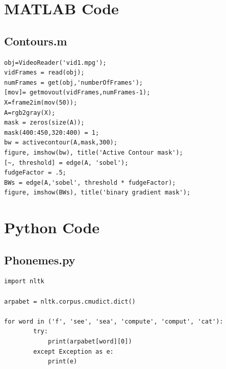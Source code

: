 \documentclass[a4paper]{article}
\begin{document}
\newpage

\appendix




\section{MATLAB Code}

\subsection{Contours.m}
\begin{lstlisting}[style=myMatlabstyle]
obj=VideoReader('vid1.mpg');
vidFrames = read(obj);
numFrames = get(obj,'numberOfFrames');
[mov]= getmovout(vidFrames,numFrames-1);
X=frame2im(mov(50));
A=rgb2gray(X);
mask = zeros(size(A));
mask(400:450,320:400) = 1;
bw = activecontour(A,mask,300);
figure, imshow(bw), title('Active Contour mask');
[~, threshold] = edge(A, 'sobel');
fudgeFactor = .5;
BWs = edge(A,'sobel', threshold * fudgeFactor);
figure, imshow(BWs), title('binary gradient mask');
\end{lstlisting}

\section{Python Code}

\subsection{Phonemes.py}
\label{Ph.py}
\begin{lstlisting}[style=myPythonstyle]
import nltk

arpabet = nltk.corpus.cmudict.dict()

for word in ('f', 'see', 'sea', 'compute', 'comput', 'cat'):
		try:
			print(arpabet[word][0])
		except Exception as e:
			print(e)
\end{lstlisting}
\end{document}
